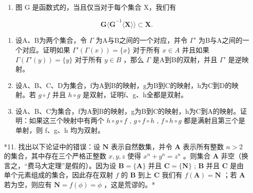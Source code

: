 \begin{enumerate}
\def\labelenumi{\arabic{enumi}.}
\setcounter{enumi}{6}
\tightlist
\item
  图 G 是函数式的，当且仅当对于每个集合 X，我们有
\end{enumerate}

\[
\mathbf {G} \langle \overline {{\mathbf {G}}} ^ {- 1} \langle \mathbf {X} \rangle \rangle \subset \mathbf {X}.
\]

\begin{enumerate}
\def\labelenumi{\arabic{enumi}.}
\setcounter{enumi}{7}
\item
  设A、B为两个集合，令 \(\Gamma\) 为A与B之间的一个对应，并令 \(\Gamma'\) 为B与A之间的一个对应。证明如果 \(\Gamma'(\Gamma(x)) = \{x\}\) 对于所有 \(x \in A\) 并且如果 \(\Gamma(\Gamma'(y)) = \{y\}\) 对于所有 \(y \in B\) ，那么 \(\Gamma\) 是A到B的双射，并且 \(\Gamma'\) 是逆映射。
\item
  设A、B、C、D为集合，f为A到B的映射，g为B到C的映射，h为C到D的映射。若 \(g \circ f\) 并且 \(h \circ g\) 是双射，证明f、g、h全都是双射。
\item
  设A、B、C为集合，f为A到B的映射，g为B到C的映射，h为C到A的映射。证明：如果这三个映射中有两个 \(h \circ g \circ f\) , \(g \circ f \circ h\) , \(f \circ h \circ g\) 都是满射且第三个是单射，则 f、g、h 均为双射。
\end{enumerate}

*11. 找出以下论证中的错误：设 \(\mathbf{N}\) 表示自然数集，并令 \(\mathbf{A}\) 表示所有整数 \(n > 2\) 的集合，其中存在三个严格正整数 \(x, y, z\) 使得 \(x^n + y^n = z^n\) 。则集合 \(\mathbf{A}\) 非空（换言之，“费马大定理”是假的）。因为设 \(\mathbf{B} = \{\mathbf{A}\}\) 并且 \(\mathbf{C} = \{\mathbf{N}\}\) ; \(\mathbf{B}\) 并且 \(\mathbf{C}\) 是由单个元素组成的集合，因此存在双射 \(f\) 的 \(\mathbf{B}\) 到上 \(\mathbf{C}\) 我们有 \(f(\mathbf{A}) = \mathbf{N}\) ；若 \(\mathbf{A}\) 若为空，则应有 \(\mathbf{N} = f(\phi) = \phi\) ，这是荒谬的。*

